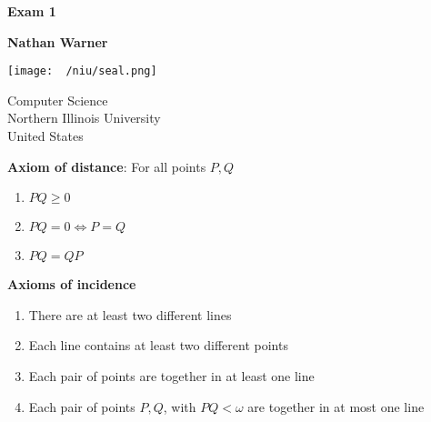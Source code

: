 \documentclass{report}
\title{\Huge{}}
\author{\huge{Nathan Warner}}
\date{\huge{}}
\begin{document}
        \begin{titlepage}
       \begin{center}
           \vspace*{1cm}
    
           \textbf{Exam 1}
    
           \vspace{0.5cm}
            
                
           \vspace{1.5cm}
    
           \textbf{Nathan Warner}
    
           \vfill
                
                
           \vspace{0.8cm}
         
           \texttt{[image: ~/niu/seal.png]}
                
           Computer Science \\
           Northern Illinois University\\
           United States\\
           
                
       \end{center}
    \end{titlepage}
    \tableofcontents
    \pagebreak 
    \item         \textbf{Axiom of distance}: For all points $P,Q$
        \begin{enumerate}
            \item $PQ \geq 0 $
            \item $PQ = 0 \iff P=Q $
            \item $PQ = QP $
        \end{enumerate}
    \item         \textbf{Axioms of incidence}
        \begin{enumerate}
            \item There are at least two different lines
            \item Each line contains at least two different points
            \item Each pair of points are together in at least one line
            \item Each pair of points $P,Q$, with $PQ < \omega$ are together in at most one line
        \end{enumerate}
\end{document}
